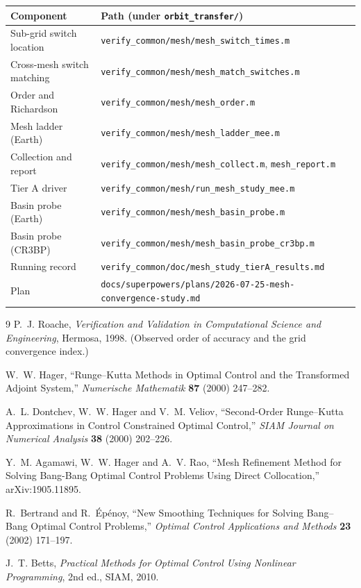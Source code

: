 \documentclass[11pt]{article}
\begin{document}
\begin{longtable}{ll}
\toprule
Component & Path (under \texttt{orbit\_transfer/}) \\
\midrule
\endhead
Sub-grid switch location   & \texttt{verify\_common/mesh/mesh\_switch\_times.m} \\
Cross-mesh switch matching & \texttt{verify\_common/mesh/mesh\_match\_switches.m} \\
Order and Richardson       & \texttt{verify\_common/mesh/mesh\_order.m} \\
Mesh ladder (Earth)        & \texttt{verify\_common/mesh/mesh\_ladder\_mee.m} \\
Collection and report      & \texttt{verify\_common/mesh/mesh\_collect.m}, \texttt{mesh\_report.m} \\
Tier A driver              & \texttt{verify\_common/mesh/run\_mesh\_study\_mee.m} \\
Basin probe (Earth)        & \texttt{verify\_common/mesh/mesh\_basin\_probe.m} \\
Basin probe (CR3BP)        & \texttt{verify\_common/mesh/mesh\_basin\_probe\_cr3bp.m} \\
Running record             & \texttt{verify\_common/doc/mesh\_study\_tierA\_results.md} \\
Plan                       & \texttt{docs/superpowers/plans/2026-07-25-mesh-convergence-study.md} \\
\bottomrule
\end{longtable}

\begin{thebibliography}{9}
P.~J. Roache, \emph{Verification and Validation in Computational Science and
Engineering}, Hermosa, 1998. (Observed order of accuracy and the grid
convergence index.)

W.~W. Hager, ``Runge--Kutta Methods in Optimal Control and the Transformed
Adjoint System,'' \emph{Numerische Mathematik} \textbf{87} (2000) 247--282.

A.~L. Dontchev, W.~W. Hager and V.~M. Veliov, ``Second-Order Runge--Kutta
Approximations in Control Constrained Optimal Control,'' \emph{SIAM Journal on
Numerical Analysis} \textbf{38} (2000) 202--226.

Y.~M. Agamawi, W.~W. Hager and A.~V. Rao, ``Mesh Refinement Method for Solving
Bang-Bang Optimal Control Problems Using Direct Collocation,''
arXiv:1905.11895.

R.~Bertrand and R.~\'Ep\'enoy, ``New Smoothing Techniques for Solving
Bang--Bang Optimal Control Problems,'' \emph{Optimal Control Applications and
Methods} \textbf{23} (2002) 171--197.

J.~T. Betts, \emph{Practical Methods for Optimal Control Using Nonlinear
Programming}, 2nd ed., SIAM, 2010.
\end{thebibliography}
\end{document}
